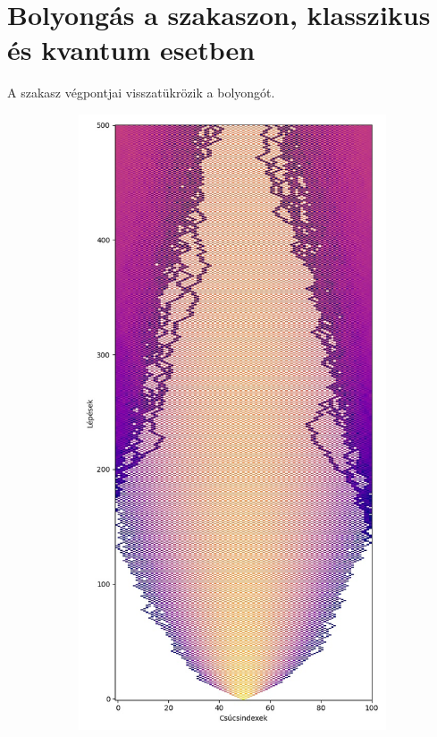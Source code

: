 \section{Bolyongás a szakaszon, klasszikus és kvantum esetben}

A szakasz végpontjai visszatükrözik a bolyongót.

\begin{figure}[H]
  \centering
  \begin{subfigure}{.45\linewidth}
    \centering
    \includegraphics[width=\linewidth]{./figures/quantum/classical_simulation_long.jpg}

\end{subfigure}
\end{figure}
